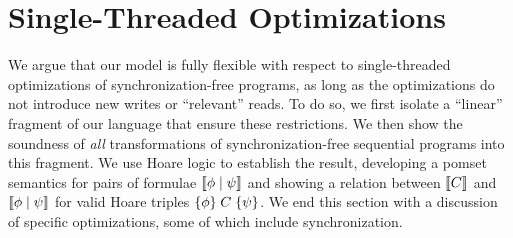 \clearpage
\section{Single-Threaded Optimizations}
\label{sec:opt}

We argue that our model is fully flexible with respect to single-threaded
optimizations of synchronization-free programs, as long as the
optimizations do not introduce new writes or ``relevant'' reads.  To do so, we
first isolate a ``linear'' fragment of our language that ensure these
restrictions.  We then show the soundness of {\em all} transformations of
synchronization-free sequential programs into this fragment.  We use Hoare
logic to establish the result, developing a pomset semantics for pairs of
formulae $\llbracket\phi\mid\psi\rrbracket$ and showing a relation between
$\llbracket C\rrbracket$ and $\llbracket\phi\mid\psi\rrbracket$ for valid Hoare triples
$\{\phi\}\allowbreak\;C\;\allowbreak\{\psi\}$.
%
We end this section with a discussion of specific optimizations, some of
which include synchronization.


